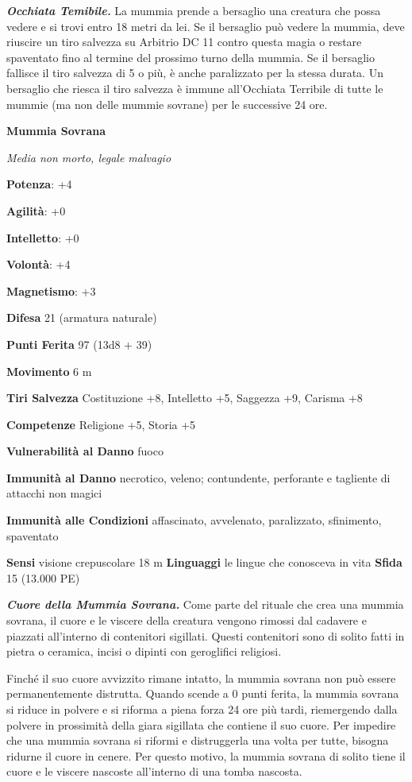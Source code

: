 \begin{multicols}{2}
\emph{\textbf{Occhiata Temibile.}} La mummia prende a bersaglio una
creatura che possa vedere e si trovi entro 18 metri da lei. Se il
bersaglio può vedere la mummia, deve riuscire un tiro salvezza su Arbitrio DC 11 contro questa magia o restare spaventato fino al termine
del prossimo turno della mummia. Se il bersaglio fallisce il tiro
salvezza di 5 o più, è anche paralizzato per la stessa durata. Un
bersaglio che riesca il tiro salvezza è immune all'Occhiata Terribile di
tutte le mummie (ma non delle mummie sovrane) per le successive 24 ore.

\textbf{Mummia Sovrana}

\emph{Media non morto, legale malvagio}

\textbf{Potenza}: +4

\textbf{Agilità}: +0

\textbf{Intelletto}: +0

\textbf{Volontà}: +4

\textbf{Magnetismo}: +3

\textbf{Difesa} 21 (armatura naturale)

\textbf{Punti Ferita} 97 (13d8 + 39)

\textbf{Movimento} 6 m

\textbf{Tiri Salvezza} Costituzione +8, Intelletto +5, Saggezza +9,
Carisma +8

\textbf{Competenze} Religione +5, Storia +5

\textbf{Vulnerabilità al Danno} fuoco

\textbf{Immunità al Danno} necrotico, veleno; contundente, perforante e
tagliente di attacchi non magici

\textbf{Immunità alle Condizioni} affascinato, avvelenato, paralizzato,
sfinimento, spaventato

\textbf{Sensi} visione crepuscolare 18 m
\textbf{Linguaggi} le lingue che conosceva in vita \textbf{Sfida} 15
(13.000 PE)

\emph{\textbf{Cuore della Mummia Sovrana.}} Come parte del rituale che
crea una mummia sovrana, il cuore e le viscere della creatura vengono
rimossi dal cadavere e piazzati all'interno di contenitori sigillati.
Questi contenitori sono di solito fatti in pietra o ceramica, incisi o
dipinti con geroglifici religiosi.

Finché il suo cuore avvizzito rimane intatto, la mummia sovrana non può
essere permanentemente distrutta. Quando scende a 0 punti ferita, la
mummia sovrana si riduce in polvere e si riforma a piena forza 24 ore
più tardi, riemergendo dalla polvere in prossimità della giara sigillata
che contiene il suo cuore. Per impedire che una mummia sovrana si
riformi e distruggerla una volta per tutte, bisogna ridurne il cuore in
cenere. Per questo motivo, la mummia sovrana di solito tiene il cuore e
le viscere nascoste all'interno di una tomba nascosta.


\end{multicols}
